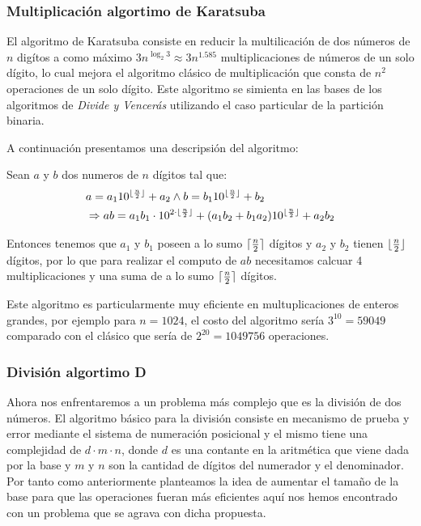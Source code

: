 \documentclass[a4paper,10pt,twocolumn]{article}
\begin{document}
\subsubsection{Multiplicación algortimo de Karatsuba}\label{sub:result}
	El algoritmo de Karatsuba consiste en reducir la multilicación de dos números de $n$ digítos a como máximo 
	$3n^{\log_2 3}\approx 3n^{1.585}$ multiplicaciones de números de un solo dígito, lo cual mejora el algoritmo clásico de multiplicación que consta de $n^2$ operaciones de un solo dígito. Este algoritmo se simienta en las bases de los algoritmos de \emph{Divide y Vencerás} utilizando el caso particular de la partición binaria.
	
	A continuación presentamos una descripsión del algoritmo:
	
	Sean $a$ y $b$ dos numeros de $n$ dígitos tal que:
		\begin{equation}
			\begin{split}
				&a=a_1 10^{\lfloor {n\over 2}\rfloor} + a_2 \wedge b=b_1 10^{\lfloor {n\over 2}\rfloor} + b_2	\\	
				&\Rightarrow ab=a_1 b_1\cdot 10^{2\cdot\lfloor {n\over 2}\rfloor}+(a_1 b_2+b_1 a_2 )10^{\lfloor {n\over 2}\rfloor}+a_2 b_2
			\end{split}
		\end{equation}			
			
	 Entonces tenemos que $a_1$ y $b_1$ poseen a lo sumo $\lceil {n\over 2}\rceil$ dígitos y $a_2$ y $b_2$ tienen $\lfloor {n\over 2}\rfloor$ dígitos, por lo que para realizar el computo de $ab$ necesitamos calcuar 4 multiplicaciones y una suma de a lo sumo $\lceil {n\over 2}\rceil$ dígitos.
	 
	 Este algoritmo es particularmente muy eficiente en multuplicaciones de enteros grandes, por ejemplo para $n=1024$, el costo del algoritmo sería $3^{10}=59049$ comparado con el clásico que sería de $2^20=1049756$ operaciones. 
	
	
\subsubsection{División algortimo D}\label{sub:result}
	Ahora nos enfrentaremos a un problema más complejo que es la división de dos números. El algoritmo básico para la división consiste en mecanismo de prueba y error mediante el sistema de numeración posicional y el mismo tiene una complejidad de $d\cdot m\cdot n$, donde $d$ es una contante en la aritmética que viene dada por la base y $m$ y $n$ son la cantidad de dígitos del numerador y el denominador. Por tanto como anteriormente planteamos la idea de aumentar el tamaño de la base para que las operaciones fueran más eficientes aquí nos hemos encontrado con un problema que se agrava con dicha propuesta.
	
\end{document}
